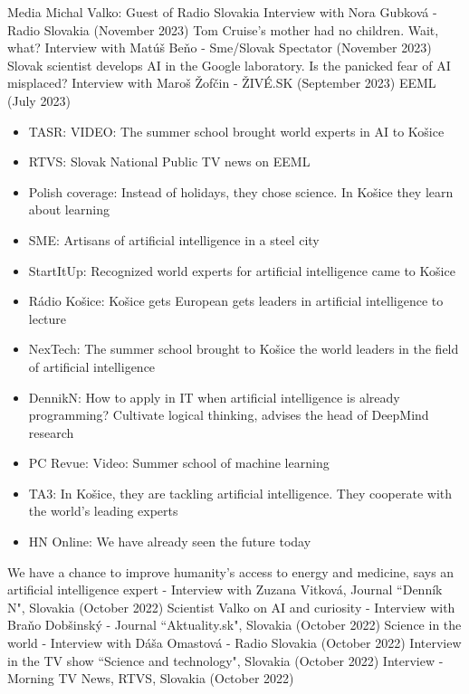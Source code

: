 \documentclass{resume}
\begin{document}
\begin{category}{Media}
\citembullet
Michal Valko: Guest of Radio Slovakia Interview with Nora Gubkov\'a - Radio Slovakia ({\sf November 2023}) 
\citembullet
Tom Cruise’s mother had no children. Wait, what? Interview with Mat\'u\v{s} Be\v{n}o - Sme/Slovak Spectator  ({\sf November 2023}) 
\citembullet
Slovak scientist develops AI in the Google laboratory. Is the panicked fear of AI misplaced? Interview with Maro\v{s} \v{Z}of\v{c}in - \v{Z}IV\'{E}.SK  ({\sf September 2023}) 
\citembullet
EEML  ({\sf July 2023}) 
\begin{itemize}
\item TASR: VIDEO: The summer school brought world experts in AI to Košice
\item RTVS: Slovak National Public TV news on EEML
\item Polish coverage: Instead of holidays, they chose science. In Košice they learn about learning
\item SME: Artisans of artificial intelligence in a steel city
\item StartItUp: Recognized world experts for artificial intelligence came to Košice
\item Rádio Košice: Košice gets European gets leaders in artificial intelligence to lecture
\item NexTech: The summer school brought to Košice the world leaders in the field of artificial intelligence
\item DennikN: How to apply in IT when artificial intelligence is already programming? Cultivate logical thinking, advises the head of DeepMind research
\item PC Revue: Video: Summer school of machine learning
\item TA3: In Košice, they are tackling artificial intelligence. They cooperate with the world's leading experts
\item HN Online: We have already seen the future today
\end{itemize}
\citembullet
We have a chance to improve humanity's access to energy and medicine, says an artificial intelligence expert - Interview with Zuzana Vitkov\' a, Journal ``Denn\'ik N", Slovakia  ({\sf October 2022})
\citembullet
Scientist Valko on AI and curiosity - Interview with Bra\v no Dob\v sinsk\' y - Journal ``Aktuality.sk", Slovakia ({\sf October 2022})
\citembullet
Science in the world - Interview with D\' a\v sa Omastov\' a  - Radio Slovakia ({\sf October 2022})
\citembullet
Interview in the TV show ``Science and technology", Slovakia ({\sf October 2022})
\citembullet
Interview - Morning TV News, RTVS, Slovakia ({\sf October 2022})

\end{category}
\end{document}
